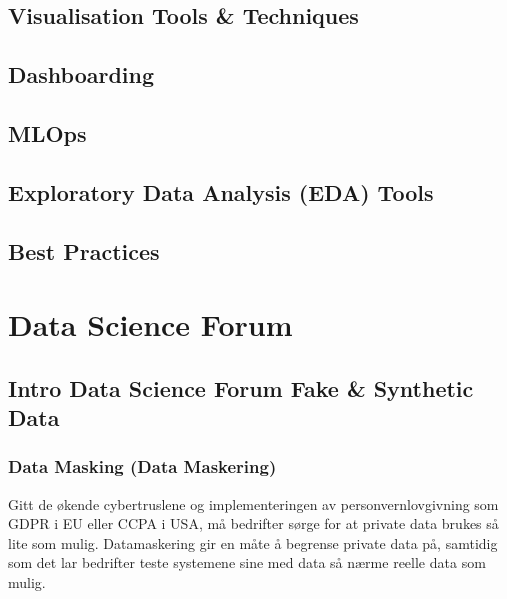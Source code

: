 \documentclass[letterpaper,10pt,english]{jupyterBook}
\begin{document}
\chapter{Visualisation Tools \& Techniques}
\label{\detokenize{src/opp/viz:visualisation-tools-techniques}}\label{\detokenize{src/opp/viz::doc}}

\chapter{Dashboarding}
\label{\detokenize{src/opp/viz:dashboarding}}

\chapter{MLOps}
\label{\detokenize{src/opp/viz:mlops}}

\chapter{Exploratory Data Analysis (EDA) Tools}
\label{\detokenize{src/opp/viz:exploratory-data-analysis-eda-tools}}
\sphinxstepscope


\chapter{Best Practices}
\label{\detokenize{src/opp/bp:best-practices}}\label{\detokenize{src/opp/bp::doc}}
\sphinxstepscope


\part{Data Science Forum}

\sphinxstepscope


\chapter{Intro Data Science Forum \sphinxhyphen{} Fake \& Synthetic Data}
\label{\detokenize{src/dsforum/fake_synth/DSF_intro:intro-data-science-forum-fake-synthetic-data}}\label{\detokenize{src/dsforum/fake_synth/DSF_intro::doc}}

\section{Data Masking (Data Maskering)}
\label{\detokenize{src/dsforum/fake_synth/DSF_intro:data-masking-data-maskering}}
\sphinxAtStartPar
Gitt de økende cybertruslene og implementeringen av personvernlovgivning som GDPR i EU eller CCPA i USA, må bedrifter sørge for at private data brukes så lite som mulig. Datamaskering gir en måte å begrense private data på, samtidig som det lar bedrifter teste systemene sine med data så nærme reelle data som mulig.
\end{document}

